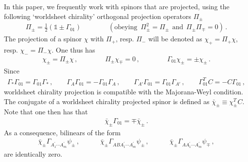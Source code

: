 \documentclass[a4paper,10pt,openany]{article}
\begin{document}
	In this paper, we frequently work with spinors that are projected, using the following `worldsheet chirality' orthogonal projection operators $\Pi_\pm$
	\begin{align}
		\label{eq:Piproj}
		\Pi_\pm = \frac12 \left(\mathds{1} \pm \Gamma_{01}\right) \qquad \qquad (\text{obeying }\, \Pi_\pm^2 = \Pi_\pm \ \ \text{and} \ \ \Pi_\pm \Pi_\mp = 0) \,.
	\end{align}
	The projection of a spinor $\chi$ with $\Pi_+$, resp. $\Pi_-$ will be denoted as $\chi_+ = \Pi_+ \chi$, resp. $\chi_- = \Pi_- \chi$. One thus has
	\begin{align}
		\chi_\pm = \Pi_\pm\chi \,,\qquad \qquad \Pi_\pm \chi_\mp = 0\,, \qquad \qquad \Gamma_{01}\chi_\pm = \pm\chi_\pm\,.
	\end{align}
	Since
	\begin{align}
		\Gamma_*\Gamma_{01} = \Gamma_{01}\Gamma_*\,,\qquad \Gamma_A\Gamma_{01} = -\Gamma_{01}\Gamma_A\,,\qquad \Gamma_{A'}\Gamma_{01} = \Gamma_{01}\Gamma_{A'}\,,\qquad \Gamma_{01}^T C = -C\Gamma_{01} \,,
	\end{align}
	worldsheet chirality projection is compatible with the Majorana-Weyl condition. The conjugate of a worldsheet chirality projected spinor is defined as $\bar\chi_\pm \equiv \chi_\pm^TC$. Note that one then has that
	\begin{align}
		\bar\chi_\pm \Gamma_{01} = \mp \bar\chi_\pm\,.
	\end{align}
	As a consequence, bilinears of the form
	\begin{align}
		\label{eq:projbil}
		\bar{\chi}_\pm\Gamma_{A_1^\prime \cdots A_m^\prime}\psi_\pm \,, \qquad \quad \bar{\chi}_\pm\Gamma_{A B A_1^\prime \cdots A_m^\prime}\psi_\pm \,, \qquad \quad \bar{\chi}_\pm\Gamma_{A A_1^\prime \cdots A_m^\prime}\psi_\mp \,,
	\end{align}
	are identically zero.
	
\end{document}
